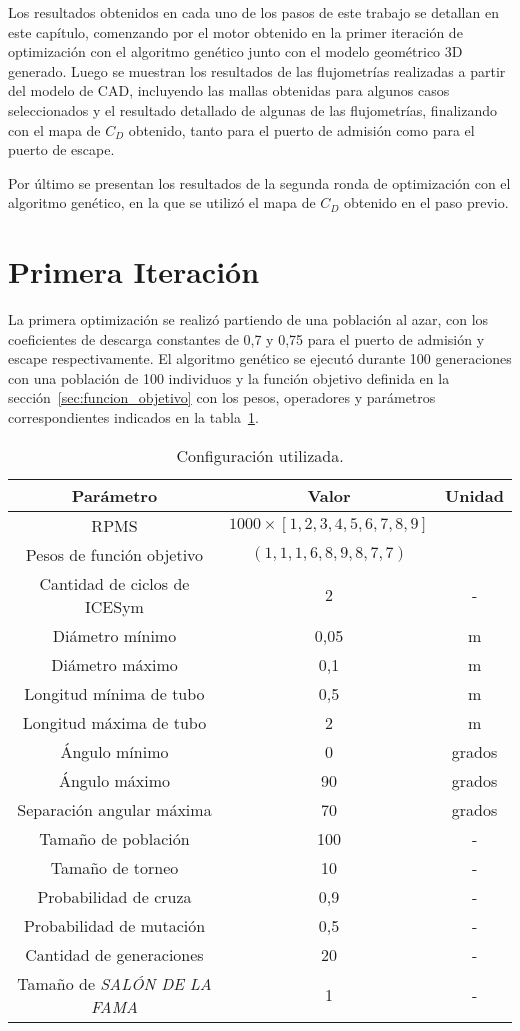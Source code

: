 Los resultados obtenidos en cada uno de los pasos de este trabajo se detallan en
este capítulo, comenzando por el motor obtenido en la primer iteración de
optimización con el algoritmo genético junto con el modelo geométrico 3D
generado.
%
Luego se muestran los resultados de las flujometrías realizadas a partir del
modelo de CAD, incluyendo las mallas obtenidas para algunos casos seleccionados
y el resultado detallado de algunas de las flujometrías, finalizando con el mapa
de $C_{D}$ obtenido, tanto para el puerto de admisión como para
el puerto de escape.

Por último se presentan los resultados de la segunda ronda de optimización con
el algoritmo genético, en la que se utilizó el mapa de $C_{D}$ obtenido en el
paso previo.

\section{Primera Iteración}
%
La primera optimización se realizó partiendo de una población al azar, con los
coeficientes de descarga constantes de 0,7 y 0,75 para el puerto de admisión y
escape respectivamente.
%
El algoritmo genético se ejecutó durante 100 generaciones con una población de
100 individuos y la función objetivo definida en la
sección~\ref{sec:funcion_objetivo} con los pesos, operadores y
parámetros correspondientes indicados en la tabla~\ref{tab:config_genetico}.

\begin{table}[ht!]
  \centering
  \begin{tabular}{ccc} \toprule
    Parámetro & Valor & Unidad \\ \midrule
    RPMS & $1000\times[1, 2, 3, 4, 5, 6, 7, 8, 9]$ & \\
    Pesos de función objetivo & $(1, 1, 1, 6, 8, 9, 8, 7, 7)$ & \\
    Cantidad de ciclos de ICESym & 2 & - \\
    Diámetro mínimo & 0,05 & m \\
    Diámetro máximo & 0,1 & m \\
    Longitud mínima de tubo & 0,5 & m \\
    Longitud máxima de tubo & 2 & m \\
    Ángulo mínimo & 0 & grados \\
    Ángulo máximo & 90 & grados \\
    Separación angular máxima & 70 & grados \\
    Tamaño de población & 100 & - \\
    Tamaño de torneo & 10 & - \\
    Probabilidad de cruza & 0,9 & - \\
    Probabilidad de mutación & 0,5 & - \\
    Cantidad de generaciones & 20 & - \\
    Tamaño de \emph{SALÓN DE LA FAMA} & 1 & - \\ \bottomrule
    \end{tabular}
  \caption{Configuración utilizada.}\label{tab:config_genetico}
\end{table}

